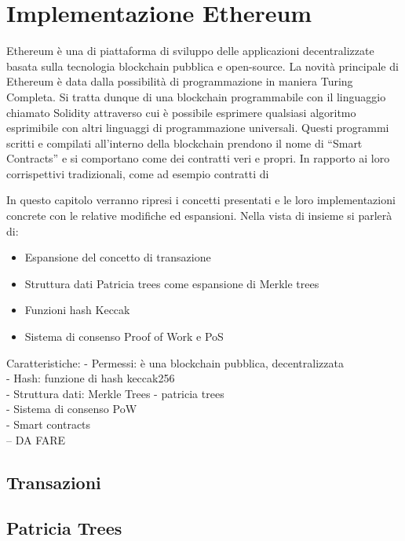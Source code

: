 \section{Implementazione Ethereum}

Ethereum è una di piattaforma di sviluppo delle applicazioni decentralizzate basata sulla tecnologia blockchain pubblica e open-source.
La novità principale di Ethereum è data dalla possibilità di programmazione in maniera Turing Completa. Si tratta dunque di una blockchain programmabile con il linguaggio chiamato Solidity attraverso cui è possibile esprimere qualsiasi algoritmo esprimibile con altri linguaggi di programmazione universali. Questi programmi scritti e compilati all’interno della blockchain prendono il nome di “Smart Contracts” e si comportano come dei contratti veri e propri. In rapporto ai loro corrispettivi tradizionali, come ad esempio contratti di 

In questo capitolo verranno ripresi i concetti presentati e le loro implementazioni concrete con le relative modifiche ed espansioni. Nella vista di insieme si parlerà di:

\begin{itemize}
\item Espansione del concetto di transazione
\item Struttura dati Patricia trees come espansione di Merkle trees
\item Funzioni hash Keccak
\item Sistema di consenso Proof of Work e PoS
\end{itemize}

Caratteristiche: 
- Permessi: è una blockchain pubblica, decentralizzata\\
- Hash: funzione di hash keccak256\\
- Struttura dati: Merkle Trees - patricia trees\\
- Sistema di consenso PoW\\
- Smart contracts\\
-- DA FARE\\

\subsection{Transazioni}

\subsection{Patricia Trees}

